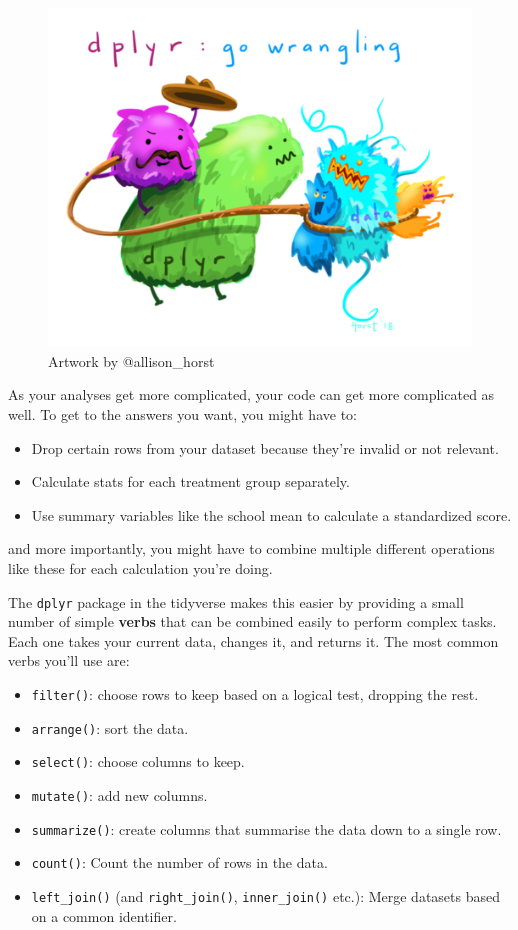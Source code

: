 \documentclass[
]{book}
\providecommand{\tightlist}{%
  \setlength{\itemsep}{0pt}\setlength{\parskip}{0pt}}
\begin{document}
\begin{figure}
\centering
\includegraphics{Images/allisonhorst/dplyr_wrangling.png}
\caption{Artwork by @allison\_horst}
\end{figure}

As your analyses get more complicated, your code can get
more complicated as well. To get to the answers you want,
you might have to:

\begin{itemize}
\tightlist
\item
  Drop certain rows from your dataset because they're invalid
  or not relevant.
\item
  Calculate stats for each treatment group separately.
\item
  Use summary variables like the school mean to calculate
  a standardized score.
\end{itemize}

and more importantly, you might have to combine multiple
different operations like these for each calculation you're
doing.

The \texttt{dplyr} package in the tidyverse makes this easier
by providing a small number of simple \textbf{verbs} that can be combined
easily to perform complex tasks. Each one takes your current
data, changes it, and returns it. The most common verbs you'll
use are:

\begin{itemize}
\tightlist
\item
  \texttt{filter()}: choose rows to keep based on a logical test,
  dropping the rest.
\item
  \texttt{arrange()}: sort the data.
\item
  \texttt{select()}: choose columns to keep.
\item
  \texttt{mutate()}: add new columns.
\item
  \texttt{summarize()}: create columns that summarise the data down
  to a single row.
\item
  \texttt{count()}: Count the number of rows in the data.
\item
  \texttt{left\_join()} (and \texttt{right\_join()}, \texttt{inner\_join()} etc.): Merge datasets
  based on a common identifier.
\end{itemize}
\end{document}
